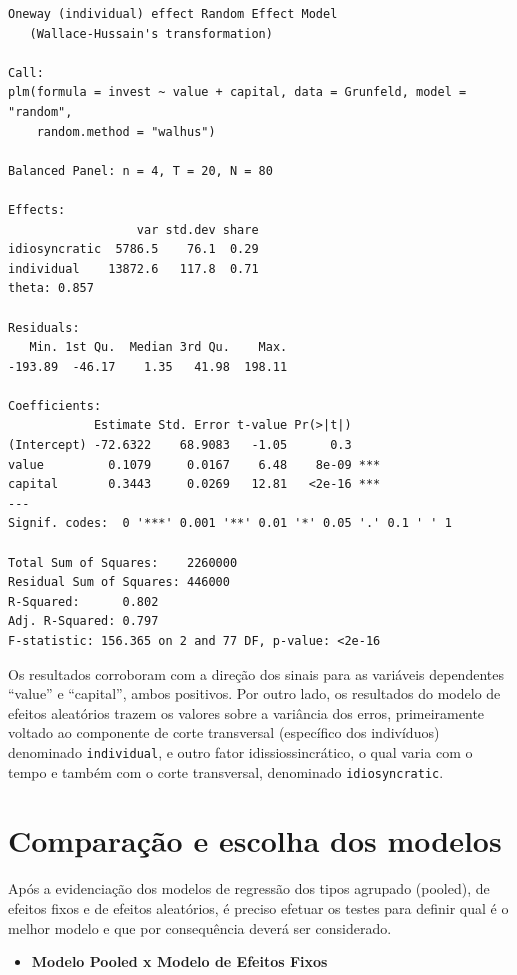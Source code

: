 \documentclass[12pt,brazil,oneside]{book}
\providecommand{\tightlist}{%
  \setlength{\itemsep}{0pt}\setlength{\parskip}{0pt}}
\begin{document}
\begin{verbatim}
Oneway (individual) effect Random Effect Model 
   (Wallace-Hussain's transformation)

Call:
plm(formula = invest ~ value + capital, data = Grunfeld, model = "random", 
    random.method = "walhus")

Balanced Panel: n = 4, T = 20, N = 80

Effects:
                  var std.dev share
idiosyncratic  5786.5    76.1  0.29
individual    13872.6   117.8  0.71
theta: 0.857

Residuals:
   Min. 1st Qu.  Median 3rd Qu.    Max. 
-193.89  -46.17    1.35   41.98  198.11 

Coefficients:
            Estimate Std. Error t-value Pr(>|t|)    
(Intercept) -72.6322    68.9083   -1.05      0.3    
value         0.1079     0.0167    6.48    8e-09 ***
capital       0.3443     0.0269   12.81   <2e-16 ***
---
Signif. codes:  0 '***' 0.001 '**' 0.01 '*' 0.05 '.' 0.1 ' ' 1

Total Sum of Squares:    2260000
Residual Sum of Squares: 446000
R-Squared:      0.802
Adj. R-Squared: 0.797
F-statistic: 156.365 on 2 and 77 DF, p-value: <2e-16
\end{verbatim}

Os resultados corroboram com a direção dos sinais para as variáveis dependentes ``value'' e ``capital'', ambos positivos. Por outro lado, os resultados do modelo de efeitos aleatórios trazem os valores sobre a variância dos erros, primeiramente voltado ao componente de corte transversal (específico dos indivíduos) denominado \texttt{individual}, e outro fator idissiossincrático, o qual varia com o tempo e também com o corte transversal, denominado \texttt{idiosyncratic}.

\hypertarget{comparacao-e-escolha-dos-modelos}{%
\section{Comparação e escolha dos modelos}\label{comparacao-e-escolha-dos-modelos}}

Após a evidenciação dos modelos de regressão dos tipos agrupado (pooled), de efeitos fixos e de efeitos aleatórios, é preciso efetuar os testes para definir qual é o melhor modelo e que por consequência deverá ser considerado.

\begin{itemize}
\tightlist
\item
  \textbf{Modelo Pooled x Modelo de Efeitos Fixos}
\end{itemize}
\end{document}
